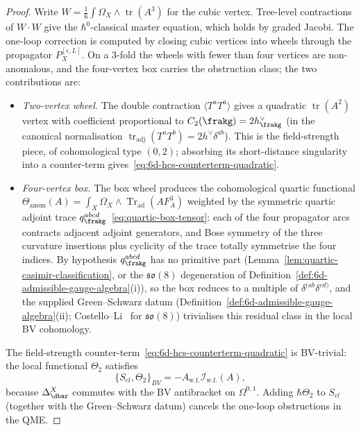 \begin{proof}
Write $W = \tfrac{1}{6} \int \Omega_X \wedge \operatorname{tr}(A^3)$ for the
cubic vertex. Tree-level contractions of $W \cdot W$ give the
$\hbar^0$-classical master equation, which holds by graded Jacobi.
The one-loop correction is computed by closing cubic vertices into
wheels through the propagator $P_X^{[\epsilon, L]}$. On a
$3$-fold the wheels with fewer than four vertices are
non-anomalous, and the four-vertex box carries the obstruction class;
the two contributions are:
\begin{itemize}
\item \emph{Two-vertex wheel.} The double contraction
$\langle T^a T^a \rangle$ gives a quadratic
$\operatorname{tr}(A^2)$ vertex with coefficient proportional to
$C_2(\frakg) = 2 h^\vee_\frakg$ (in the canonical normalisation
$\operatorname{tr}_{\mathrm{adj}}(T^a T^b) = 2 h^\vee \delta^{ab}$).
This is the field-strength piece, of cohomological type $(0, 2)$;
absorbing its short-distance singularity into a counter-term
gives~\eqref{eq:6d-hcs-counterterm-quadratic}.
\item \emph{Four-vertex box.} The box wheel produces the
cohomological quartic functional
$\Theta_{\mathrm{anom}}(A)
= \int_X\Omega_X\wedge\operatorname{Tr}_{\mathrm{ad}}(A F_A^3)$
weighted by the symmetric quartic adjoint trace
$q^{abcd}_\frakg$~\eqref{eq:quartic-box-tensor}: each of the four
propagator arcs contracts adjacent adjoint generators, and Bose
symmetry of the three curvature insertions plus cyclicity of the
trace totally symmetrise the four indices. By hypothesis
$q^{abcd}_\frakg$ has no primitive part
(Lemma~\ref{lem:quartic-casimir-classification}, or the
$\mathfrak{so}(8)$ degeneration of
Definition~\ref{def:6d-admissible-gauge-algebra}(i)), so the box
reduces to a multiple of
$\delta^{(ab}\delta^{cd)}$, and the supplied Green--Schwarz datum
(Definition~\ref{def:6d-admissible-gauge-algebra}(ii);
Costello--Li~\cite{CostelloLi2019} for $\mathfrak{so}(8)$)
trivialises this residual class in the local BV cohomology.
\end{itemize}
The field-strength counter-term~\eqref{eq:6d-hcs-counterterm-quadratic} is
BV-trivial: the local functional $\Theta_2$ satisfies
\[
 \{S_{cl}, \Theta_2\}_{BV}
 =
 -A_{\mathrm{w.f.}}\mathcal I_{\mathrm{w.f.}}(A),
\]
because $\Delta_{\dbar}^X$ commutes with the BV antibracket on $\Omega^{0,1}$.
Adding $\hbar \Theta_2$ to $S_{cl}$ (together with the Green--Schwarz
datum) cancels the one-loop obstructions in the QME.


\end{proof}
